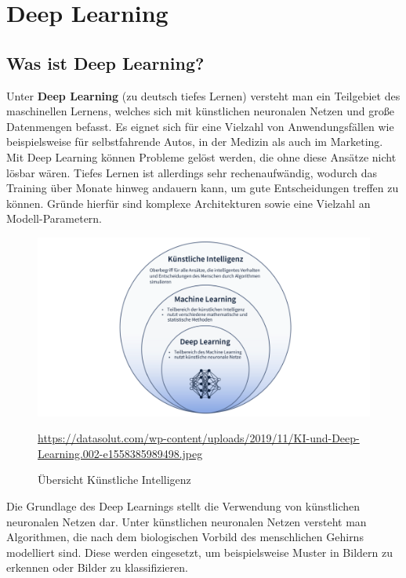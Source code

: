 \chapter{Deep Learning}

\section{Was ist Deep Learning?}

Unter \textbf{Deep Learning} (zu deutsch tiefes Lernen) versteht man ein Teilgebiet des maschinellen Lernens, welches sich mit künstlichen neuronalen Netzen und große Datenmengen befasst. Es eignet sich für eine Vielzahl von Anwendungsfällen wie beispielsweise für selbstfahrende Autos, in der Medizin als auch im Marketing. \cite{datasolut2}\\

Mit Deep Learning können Probleme gelöst werden, die ohne diese Ansätze nicht lösbar wären. Tiefes Lernen ist allerdings sehr rechenaufwändig, wodurch das Training über Monate hinweg andauern kann, um gute Entscheidungen treffen zu können. Gründe hierfür sind komplexe Architekturen sowie eine Vielzahl an Modell-Parametern. \cite{datasolut2} \\

\begin{figure}[H]
	\centering
	\includegraphics[width=\textwidth]{kapitel3/images/KI_Uebersicht.png}
	\label{fig:ki-übersicht}
	\caption{Übersicht Künstliche Intelligenz}
	\vspace{0.2cm}
	\quelle\url{https://datasolut.com/wp-content/uploads/2019/11/KI-und-Deep-Learning.002-e1558385989498.jpeg}
\end{figure}

Die Grundlage des Deep Learnings stellt die Verwendung von künstlichen neuronalen Netzen dar. Unter künstlichen neuronalen Netzen versteht man Algorithmen, die nach dem biologischen Vorbild des menschlichen Gehirns modelliert sind. Diese werden eingesetzt, um beispielsweise Muster in Bildern zu erkennen oder Bilder zu klassifizieren. \cite{datasolut2}\\

